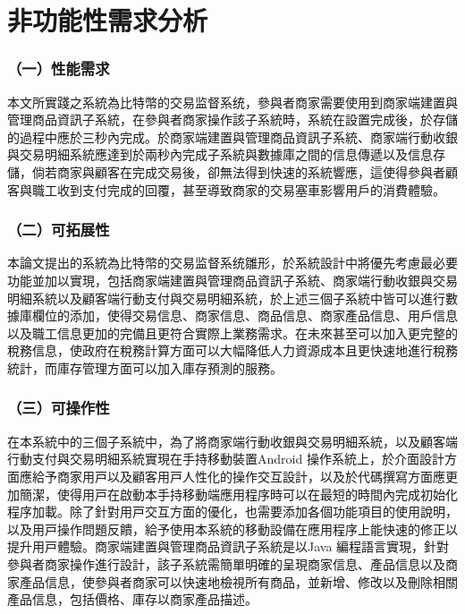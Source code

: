 	\section{非功能性需求分析}

	\subsubsection{（一）性能需求}
	
	本文所實踐之系統為比特幣的交易监督系统，參與者商家需要使用到商家端建置與管理商品資訊子系統，在參與者商家操作該子系統時，系統在設置完成後，於存儲的過程中應於三秒內完成。於商家端建置與管理商品資訊子系統、商家端行動收銀與交易明細系統應達到於兩秒內完成子系統與數據庫之間的信息傳遞以及信息存儲，倘若商家與顧客在完成交易後，卻無法得到快速的系統響應，這使得參與者顧客與職工收到⽀付完成的回覆，甚至導致商家的交易塞車影響用戶的消費體驗。

	\subsubsection{（二）可拓展性}

	本論文提出的系統為比特幣的交易监督系统雛形，於系統設計中將優先考慮最必要功能並加以實現，包括商家端建置與管理商品資訊子系統、商家端行動收銀與交易明細系統以及顧客端行動支付與交易明細系統，於上述三個子系統中皆可以進行數據庫欄位的添加，使得交易信息、商家信息、商品信息、商家產品信息、用戶信息以及職工信息更加的完備且更符合實際上業務需求。在未來甚⾄可以加⼊更完整的稅務信息，使政府在稅務計算⽅⾯可以大幅降低⼈⼒資源成本且更快速地進⾏稅務統計，而庫存管理⽅⾯可以加⼊庫存預測的服務。

	\subsubsection{（三）可操作性}
	在本系統中的三個⼦系統中，為了將商家端⾏動收銀與交易明細系統，以及顧客端⾏動⽀付與交易明細系統實現在⼿持移動裝置Android 操作系統上，於介⾯設計⽅⾯應給予商家⽤⼾以及顧客⽤⼾⼈性化的操作交互設計，以及於代碼撰寫⽅⾯應更加簡潔，使得⽤⼾在啟動本⼿持移動端應⽤程序時可以在最短的時間內完成初始化程序加載。除了針對⽤⼾交互⽅⾯的優化，也需要添加各個功能項⽬的使⽤說明，以及⽤⼾操作問題反饋，給予使用本系統的移動設備在應⽤程序上能快速的修正以提升⽤⼾體驗。商家端建置與管理商品資訊⼦系統是以Java 編程語⾔實現，針對參與者商家操作進⾏設計，該⼦系統需簡單明確的呈現商家信息、產品信息以及商家產品信息，使參與者商家可以快速地檢視所有商品，並新增、修改以及刪除相關產品信息，包括價格、庫存以商家產品描述。

